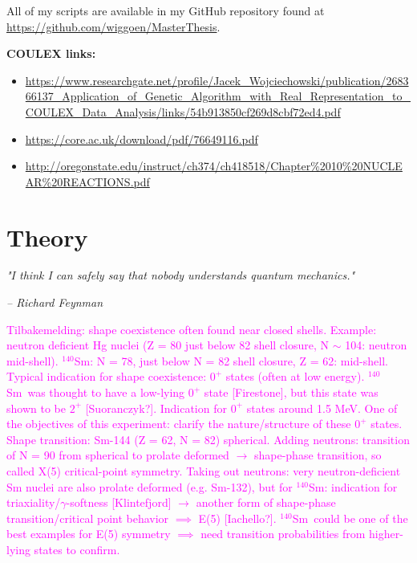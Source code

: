 \documentclass[twoside,english]{uiofysmaster/uiofysmaster}
\newcommand{\Sm}{$^{140}$Sm} %
\newcommand{\ga}{$\gamma$}
\begin{document}
All of my scripts are available in my GitHub repository found at \\ \url{https://github.com/wiggoen/MasterThesis}.

\bigskip

\textbf{COULEX links:}
\begin{itemize}
	\item \url{https://www.researchgate.net/profile/Jacek_Wojciechowski/publication/268366137_Application_of_Genetic_Algorithm_with_Real_Representation_to_COULEX_Data_Analysis/links/54b913850cf269d8cbf72ed4.pdf}
	\item \url{https://core.ac.uk/download/pdf/76649116.pdf}
	\item \url{http://oregonstate.edu/instruct/ch374/ch418518/Chapter%2010%20NUCLEAR%20REACTIONS.pdf}
\end{itemize}




\chapter{Theory}
\epigraph{\textit{"I think I can safely say that nobody understands quantum mechanics."}}{\textit{– Richard Feynman}}

\textcolor{Magenta}{Tilbakemelding: \newline 
shape coexistence often found near closed shells. Example: neutron deficient Hg nuclei (Z = 80 just below 82 shell closure, N $\sim$ 104: neutron mid-shell). \newline
\Sm: N = 78, just below N = 82 shell closure, Z = 62: mid-shell. \newline
Typical indication for shape coexistence: $0^+$ states (often at low energy). \newline 
\Sm\ was thought to have a low-lying $0^+$ state [Firestone], but this state was shown to be $2^+$ [Suoranczyk?]. Indication for $0^+$ states around 1.5 MeV. \newline 
One of the objectives of this experiment: clarify the nature/structure of these $0^+$ states. \newline 
Shape transition: Sm-144 (Z = 62, N = 82) spherical. Adding neutrons: transition of N = 90 from spherical to prolate deformed $\rightarrow$ shape-phase transition, so called X(5) critical-point symmetry. \newline
Taking out neutrons: very neutron-deficient Sm nuclei are also prolate deformed (e.g. Sm-132), but for \Sm: indication for triaxiality/\ga-softness [Klintefjord] $\rightarrow$ another form of shape-phase transition/critical point behavior $\implies$ E(5) [Iachello?]. \Sm\ could be one of the best examples for E(5) symmetry $\implies$ need transition probabilities from higher-lying states to confirm.} \newline
\end{document}
